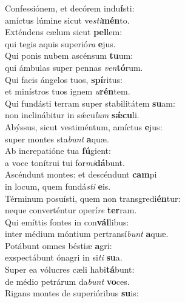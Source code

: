\evenverse Confessiónem, et decórem indu\textbf{í}sti:~\*\\
\evenverse amíctus lúmine sicut ve\textit{sti}\textbf{mén}to.\\
\oddverse Exténdens cælum sicut \textbf{pel}lem:~\*\\
\oddverse qui tegis aquis superió\textit{ra} \textbf{e}jus.\\
\evenverse Qui ponis nubem ascénsum \textbf{tu}um:~\*\\
\evenverse qui ámbulas super pennas \textit{ven}\textbf{tó}rum.\\
\oddverse Qui facis ángelos tuos, \textbf{spí}ritus:~\*\\
\oddverse et minístros tuos ignem \textit{u}\textbf{rén}tem.\\
\evenverse Qui fundásti terram super stabilitátem \textbf{su}am:~\*\\
\evenverse non inclinábitur in sǽcu\textit{lum} \textbf{sǽ}\textbf{cu}li.\\
\oddverse Abýssus, sicut vestiméntum, amíctus \textbf{e}jus:~\*\\
\oddverse super montes sta\textit{bunt} \textbf{a}quæ.\\
\evenverse Ab increpatióne tua \textbf{fú}gient:~\*\\
\evenverse a voce tonítrui tui for\textit{mi}\textbf{dá}bunt.\\
\oddverse Ascéndunt montes: et descéndunt \textbf{cam}pi~\*\\
\oddverse in locum, quem fundá\textit{sti} \textbf{e}is.\\
\evenverse Términum posuísti, quem non transgredi\textbf{én}tur:~\*\\
\evenverse neque converténtur operí\textit{re} \textbf{ter}ram.\\
\oddverse Qui emíttis fontes in con\textbf{vál}libus:~\*\\
\oddverse inter médium móntium pertransí\textit{bunt} \textbf{a}quæ.\\
\evenverse Potábunt omnes béstiæ \textbf{a}gri:~\*\\
\evenverse exspectábunt ónagri in si\textit{ti} \textbf{su}a.\\
\oddverse Super ea vólucres cæli habi\textbf{tá}bunt:~\*\\
\oddverse de médio petrárum da\textit{bunt} \textbf{vo}ces.\\
\evenverse Rigans montes de superióribus \textbf{su}is:~\*\\
